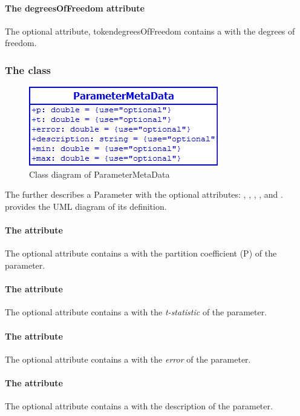 \paragraph{The degreesOfFreedom attribute}
The optional attribute, token{degreesOfFreedom} contains a 
with the degrees of freedom.

\subsubsection{The  class}
\begin{figure}[h]
	\includegraphics[scale=0.8]{img/ParameterMetaData}
	\caption{Class diagram of ParameterMetaData}
	\label{ParameterMetaData}
\end{figure}

\label{parametermetadata-class}
The \ParameterMetaData further describes a Parameter with the optional
attributes: , , , ,
 and .  provides the UML diagram of
its definition.

\paragraph{The  attribute}
The optional attribute  contains a  with the partition
coefficient (P) of the parameter.

\paragraph{The  attribute}
The optional attribute  contains a  with the
\emph{t-statistic} of the parameter.

\paragraph{The  attribute}
The optional attribute  contains a  with the
\emph{error} of the parameter.

\paragraph{The  attribute}
The optional attribute  contains a  with the
description of the parameter.

